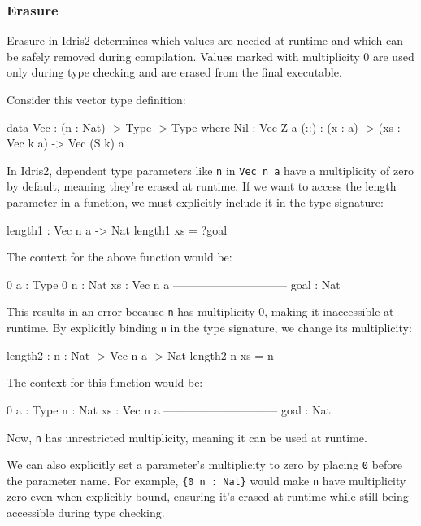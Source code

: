 \documentclass[]{rptuseminar}
\begin{document}
\subsubsection{Erasure}
Erasure in Idris2 determines which values are needed at runtime and which can be safely removed during compilation. Values marked with multiplicity 0 are used only during type checking and are erased from the final executable.

Consider this vector type definition:

\begin{idris}
data Vec : (n : Nat) -> Type -> Type where
    Nil : Vec Z a
    (::) : (x : a) -> (xs : Vec k a) -> Vec (S k) a
\end{idris}

In Idris2, dependent type parameters like \texttt{n} in \texttt{Vec n a} have a multiplicity of zero by default, meaning they're erased at runtime. If we want to access the length parameter in a function, we must explicitly include it in the type signature:

\begin{idris}
length1 : Vec n a -> Nat
length1 xs = ?goal 
\end{idris}

The context for the above function would be:
\begin{idris}
0 a : Type
0 n : Nat
xs : Vec n a
------------------------------
goal : Nat
\end{idris}
This results in an error because \texttt{n} has multiplicity 0, making it inaccessible at runtime. By explicitly binding \texttt{n} in the type signature, we change its multiplicity:

\begin{idris}
length2 : {n : Nat} -> Vec n a -> Nat
length2 {n} xs = n
\end{idris}

The context for this function would be:
\begin{idris}
0 a : Type
n : Nat
xs : Vec n a
------------------------------
goal : Nat
\end{idris}
Now, \texttt{n} has unrestricted multiplicity, meaning it can be used at runtime.

We can also explicitly set a parameter's multiplicity to zero by placing \texttt{0} before the parameter name. For example, \texttt{\{0 n : Nat\}} would make \texttt{n} have multiplicity zero even when explicitly bound, ensuring it's erased at runtime while still being accessible during type checking.
\end{document}
